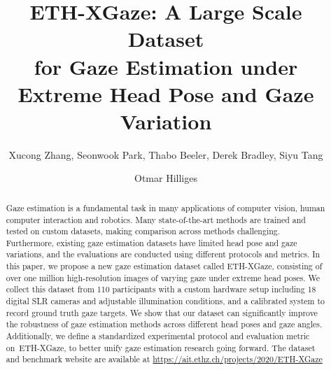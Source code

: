 \documentclass[runningheads]{llncs}
\newcommand{\datasetname}{ETH-XGaze\xspace}
\newcommand{\numparticipant}{110\xspace}
\begin{document}
\pagestyle{headings}
\mainmatter
\def\ECCVSubNumber{3477}  
\title{\datasetname: A Large Scale Dataset \\ for Gaze Estimation under Extreme Head Pose and Gaze Variation}


\author{Xucong Zhang,
Seonwook Park,
Thabo Beeler,
Derek Bradley,
Siyu Tang \and
Otmar Hilliges}


\maketitle

\begin{abstract}
Gaze estimation is a fundamental task in many applications of computer vision, human computer interaction and robotics. Many state-of-the-art methods are trained and tested on custom datasets, making comparison across methods challenging.  Furthermore, existing gaze estimation datasets have limited head pose and gaze variations, and the evaluations are conducted using different protocols and metrics.
In this paper, we propose a new gaze estimation dataset called \datasetname, consisting of over one million high-resolution images of varying gaze under extreme head poses. We collect this dataset from \numparticipant participants with a custom hardware setup including 18 digital SLR cameras and adjustable illumination conditions, and a calibrated system to record ground truth gaze targets.
We show that our dataset can significantly improve the robustness of gaze estimation methods across different head poses and gaze angles.  Additionally, we define a standardized experimental protocol and evaluation metric on~\datasetname, to better unify gaze estimation research going forward. The dataset and benchmark website are available at
\newcommand{\dataseturl}{\url{https://ait.ethz.ch/projects/2020/ETH-XGaze}}
\dataseturl \end{abstract}
\end{document}
